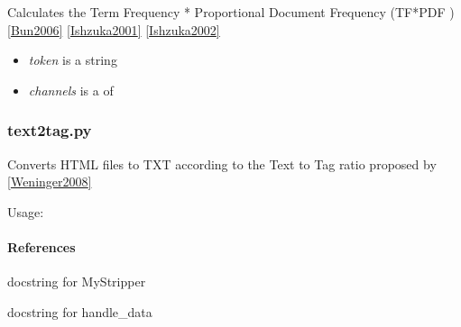 \documentclass[letterpaper,10pt,english]{sphinxmanual}
\begin{document}

\begin{fulllineitems}
\label{theseus:theseus.processor.theseus.tfpdf}
Calculates the Term Frequency * Proportional Document Frequency (TF*PDF ) {\hyperref[theseus:bun2006]{{[}Bun2006{]}}} {\hyperref[theseus:ishzuka2001]{{[}Ishzuka2001{]}}} {\hyperref[theseus:ishzuka2002]{{[}Ishzuka2002{]}}}
\begin{itemize}
\item {} 
\emph{token} is a string

\item {} 
\emph{channels} is a  of 

\end{itemize}

\end{fulllineitems}

\label{theseus:module-theseus.processor.text2tag}

\subsubsection{text2tag.py}
\label{theseus:text2tag-py}
Converts HTML files to TXT according to the Text to Tag ratio proposed by {\hyperref[theseus:weninger2008]{{[}Weninger2008{]}}}

Usage:
\paragraph{References}

\begin{fulllineitems}
\label{theseus:theseus.processor.text2tag.MyStripper}
docstring for MyStripper

\begin{fulllineitems}
\label{theseus:theseus.processor.text2tag.MyStripper.handle_data}
docstring for handle\_data

\end{fulllineitems}


\end{fulllineitems}
\end{document}
